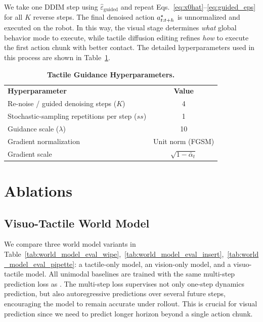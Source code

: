 We take one DDIM step using $\hat{\varepsilon}_{\mathrm{guided}}$ and repeat
Eqs.~\eqref{eq:x0hat}--\eqref{eq:guided_eps} for all $K$ reverse steps. The final
denoised action $a^\star_{t:t+h}$ is unnormalized and executed on the robot.
In this way, the visual stage determines \emph{what} global behavior mode to
execute, while tactile diffusion editing refines \emph{how} to execute the first
action chunk with better contact. The detailed hyperparameters used in this process are shown in Table~\ref{tab:tactile_guidance}.
  \begin{table}[h]
  \centering
  \caption{\textbf{Tactile Guidance Hyperparameters.}}
  \label{tab:tactile_guidance}
  \begin{tabular}{lc}
  \toprule
  \textbf{Hyperparameter} & \textbf{Value} \\
  Re-noise / guided denoising steps ($K$)  & 4 \\
  Stochastic-sampling repetitions per step ($ss$) & 1 \\
  Guidance scale ($\lambda$)               & 10 \\
  Gradient normalization                   & Unit norm (FGSM) \\
  Gradient scale                           & $\sqrt{1-\bar\alpha_t}$ \\
  
  \bottomrule
  \end{tabular}
  \end{table}


\section{Ablations}
\label{app:ablations}
\subsection{Visuo-Tactile World Model}
\label{app:world_model_ablation}
 We compare three world model variants in Table~\ref{tab:world_model_eval_wipe},~\ref{tab:world_model_eval_insert},~\ref{tab:world_model_eval_pipette}: a tactile-only model, an vision-only model, and a visuo-tactile model. All unimodal baselines are trained with the same multi-step prediction loss as \ours. The multi-step loss supervises not only one-step dynamics prediction, but also autoregressive predictions over several future steps, encouraging the model to remain accurate under rollout. This is crucial for visual prediction since we need to predict longer horizon beyond a single action chunk. 

